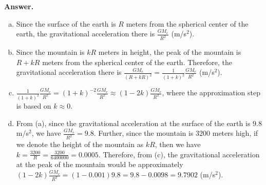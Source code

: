 \documentclass[11pt,letterpaper]{article}
\newcounter{problem}
\newcommand{\problem}{
	\stepcounter{problem}%
	\noindent \textbf{Problem \theproblem. }%
}
\newcommand{\answer}{\noindent \textbf{Answer. }}
\begin{document}
\answer 
\begin{enumerate}[(a)]
    \item Since the surface of the earth is $R$ meters from the spherical center of the earth, the gravitational acceleration there is $\frac{GM_e}{R^2}$ (m/s$^2$).
    \item Since the mountain is $kR$ meters in height, the peak of the mountain is $R+kR$ meters from the spherical center of the earth.  Therefore, the gravitational acceleration there is $\frac{GM_e}{(R+kR)^2} = \frac{1}{(1+k)^2}\frac{GM_e}{R^2}$ (m/s$^2$).
    \item $\frac{1}{(1+k)^2}\frac{GM_e}{R^2}= (1+k)^{-2}\frac{GM_e}{R^2} \approx (1-2k)\frac{GM_e}{R^2}$, where the approximation step is based on $k \approx 0$.
    \item From (a), since the gravitational acceleration at the surface of the earth is $9.8$ m/s$^2$, we have $\frac{GM_e}{R^2} = 9.8$.  Further, since the mountain is $3200$ meters high, if we denote the height of the mountain as $kR$, then we have $k = \frac{3200}{R} = \frac{3200}{6400000} = 0.0005$.  Therefore, from (c), the gravitational acceleration at the peak of the mountain would be approximately $(1-2k)\frac{GM_e}{R^2} = (1-0.001)9.8 = 9.8 - 0.0098 = 9.7902$ (m/s$^2$).
\end{enumerate}
\vspace{6mm}


\end{document}
